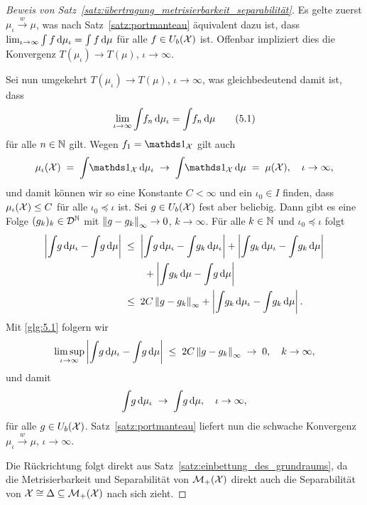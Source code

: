 \documentclass[../thesis/thesis.tex]{subfiles}
\begin{document}
\begin{proof}[Beweis von Satz~\ref{satz:übertragung_metrisierbarkeit_separabilität}]
		Es gelte zuerst $\mu_\iota \xrightarrow{w} \mu$, was nach Satz~\ref{satz:portmanteau} äquivalent dazu ist, dass $\lim_{\iota \to \infty} \int_{} \, f \, \mathrm{d}\mu_\iota = \int_{} \, f \, \mathrm{d}\mu$ für alle 
		$f \in U_b(\mathcal{X})$ ist. Offenbar impliziert dies die Konvergenz $T(\mu_\iota) \to T(\mu)$, $\iota \to \infty$.
		
		Sei nun umgekehrt $T(\mu_\iota) \to T(\mu)$, $\iota \to \infty$, was gleichbedeutend damit ist, dass 
		\[ \lim_{\iota \to \infty} \int_{} \, f_n \, \mathrm{d}\mu_\iota = \int_{} \, f_n \, \mathrm{d}\mu \label{glg:5.1} \tag{5.1} \] 
		für alle $n \in \mathbb{N}$ gilt.
		Wegen $f_1 = \indfct_\X$ gilt auch
		\[ \mu_\iota(\X) \; = \; \measureint{}{\indfct_\X}{\mu_\iota} \; \to \; \measureint{}{\indfct_\X}{\mu} \; = \; \mu(\X), \quad \iota \to \infty \text{,} \]
		und damit können wir so eine Konstante $C < \infty$ und ein $\iota_0 \in I$ finden, dass $\mu_\iota(\mathcal{X}) \leq C$ für alle $\iota_0 \preceq \iota$ ist.
		Sei $g \in U_b(\mathcal{X})$ fest aber beliebig. Dann gibt es eine Folge $(g_k)_k \in \mathcal{D}^{\mathbb{N}}$ mit $\left\lVert g - g_k\right\rVert_\infty \to 0$, $k \to \infty$. Für alle $k \in \mathbb{N}$ und $\iota_0 \preceq \iota$ folgt
		\begin{align*}
			\left| \int_{} \, g \, \mathrm{d}\mu_\iota - \int_{} \, g \, \mathrm{d}\mu \right| \; &\leq \; 
			\left| \int_{} \, g \, \mathrm{d}\mu_\iota - \int_{} \, g_k \, \mathrm{d}\mu_\iota \right| + 
			\left| \int_{} \, g_k \, \mathrm{d}\mu_\iota - \int_{} \, g_k \, \mathrm{d}\mu \right| \\
			& \qquad + 
			\left| \int_{} \, g_k \, \mathrm{d}\mu - \int_{} \, g \, \mathrm{d}\mu \right| \\
			&\leq \; 2 C \left\lVert g - g_k\right\rVert_\infty + \left| \int_{} \, g_k \, \mathrm{d}\mu_\iota - 
			\int_{} \, g_k \, \mathrm{d}\mu \right| \text{.}
		\end{align*}
		Mit \eqref{glg:5.1} folgern wir
		\[ \limsup_{\iota \to \infty} \left| \int_{} \, g \, \mathrm{d}\mu_\iota - \int_{} \, g \, \mathrm{d}\mu \right| \; \leq \; 2 C \left\lVert g - g_k\right\rVert_\infty \; \to \; 0, \quad k \to \infty, \]
		und damit 
		\[ \int_{} \, g \, \mathrm{d}\mu_\iota \; \to \; \int_{} \, g \, \mathrm{d}\mu, \quad \iota \to \infty, \]
		für alle $g \in U_b(\mathcal{X})$. Satz~\ref{satz:portmanteau} liefert nun die schwache Konvergenz $\mu_\iota \xrightarrow{w} \mu$, $\iota \to \infty$.
		
		Die Rückrichtung folgt direkt aus Satz~\ref{satz:einbettung_des_grundraums}, da die Metrisierbarkeit und Separabilität von $\mathcal{M}_{+}(\mathcal{X})$ direkt auch die Separabilität von $\mathcal{X} \cong \Delta \subseteq \mathcal{M}_{+}(\mathcal{X})$ nach sich zieht.
	\end{proof}
\end{document}
